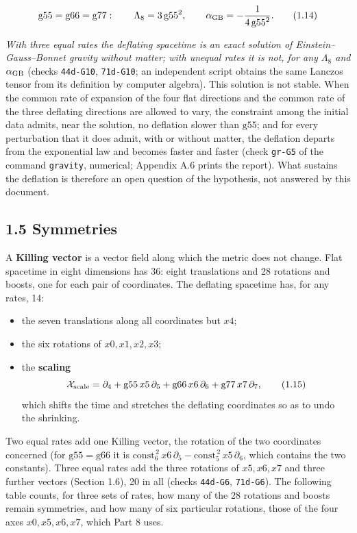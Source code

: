 \documentclass[
  10pt,
]{article}
\providecommand{\tightlist}{%
  \setlength{\itemsep}{0pt}\setlength{\parskip}{0pt}}
\begin{document}
\[\mathrm{g55}=\mathrm{g66}=\mathrm{g77}:\qquad\Lambda_8=3\,\mathrm{g55}^2,\qquad
\alpha_{\rm GB}=-\frac{1}{4\,\mathrm{g55}^2}.\tag{1.14}\]

\emph{With three equal rates the deflating spacetime is an exact
solution of Einstein--Gauss--Bonnet gravity without matter; with unequal
rates it is not, for any \(\Lambda_8\) and \(\alpha_{\rm GB}\)} (checks
\texttt{44d-G10}, \texttt{71d-G10}; an independent script obtains the
same Lanczos tensor from its definition by computer algebra). This
solution is not stable. When the common rate of expansion of the four
flat directions and the common rate of the three deflating directions
are allowed to vary, the constraint among the initial data admits, near
the solution, no deflation slower than \(\mathrm{g55}\); and for every
perturbation that it does admit, with or without matter, the deflation
departs from the exponential law and becomes faster and faster (check
\texttt{gr-G5} of the command \texttt{gravity}, numerical; Appendix A.6
prints the report). What sustains the deflation is therefore an open
question of the hypothesis, not answered by this document.

\hypertarget{symmetries}{%
\subsection{1.5 Symmetries}\label{symmetries}}

A \textbf{Killing vector} is a vector field along which the metric does
not change. Flat spacetime in eight dimensions has 36: eight
translations and 28 rotations and boosts, one for each pair of
coordinates. The deflating spacetime has, for any rates, 14:

\begin{itemize}
\tightlist
\item
  the seven translations along all coordinates but \(x4\);
\item
  the six rotations of \(x0,x1,x2,x3\);
\item
  the \textbf{scaling}
  \[\mathcal X_{\rm scale}=\partial_4+\mathrm{g55}\,x5\,\partial_5+\mathrm{g66}\,x6\,\partial_6+\mathrm{g77}\,x7\,\partial_7,\tag{1.15}\]
  which shifts the time and stretches the deflating coordinates so as to
  undo the shrinking.
\end{itemize}

Two equal rates add one Killing vector, the rotation of the two
coordinates concerned (for \(\mathrm{g55}=\mathrm{g66}\) it is
\(\mathrm{const}_6^{\,2}\,x6\,\partial_5-\mathrm{const}_5^{\,2}\,x5\,\partial_6\),
which contains the two constants). Three equal rates add the three
rotations of \(x5,x6,x7\) and three further vectors (Section 1.6), 20 in
all (checks \texttt{44d-G6}, \texttt{71d-G6}). The following table
counts, for three sets of rates, how many of the 28 rotations and boosts
remain symmetries, and how many of six particular rotations, those of
the four axes \(x0,x5,x6,x7\), which Part 8 uses.
\end{document}
